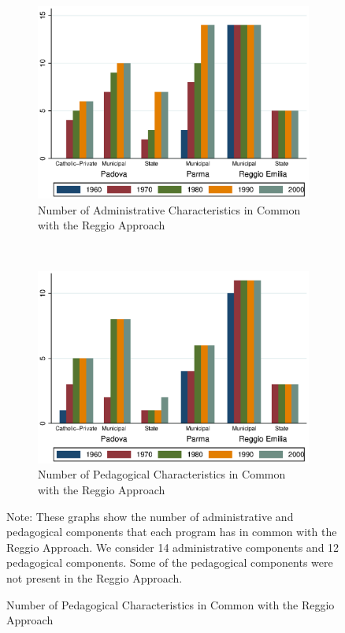 \begin{figure}[H]
\begin{center}
\begin{subfigure}[b]{0.55\textwidth}
	\caption{Number of Administrative Characteristics in Common with the Reggio Approach}\label{fig:agg-admin}
	\includegraphics[width=\textwidth]{../../output/aggregateAdministrative.eps}
\end{subfigure}%
~
\begin{subfigure}[b]{0.55\textwidth}
	\caption{Number of Pedagogical Characteristics in Common with the Reggio Approach}\label{fig:agg-ped}
	\includegraphics[width=\textwidth]{../../output/aggregatePedagogical.eps}
\end{subfigure}%
\end{center}
\raggedright \footnotesize Note: These graphs show the number of administrative and pedagogical components that each program has in common with the Reggio Approach. We consider 14 administrative components and 12 pedagogical components. Some of the pedagogical components were not present in the Reggio Approach. 
\end{figure}

